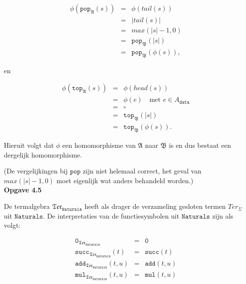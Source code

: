 \documentclass[a4paper,11pt]{article}
\begin{document}
\begin{eqnarray*}
\phi(\texttt{pop}_{\mathfrak{A}}(s)) & = & \phi(tail(s)) \\
                                     & = & |tail(s)| \\
                                     & = & max(|s| - 1, 0) \\
                                     & = & \texttt{pop}_{\mathfrak{B}}(|s|) \\
                                     & = & \texttt{pop}_{\mathfrak{B}}(\phi(s)),
\end{eqnarray*}

en

\begin{eqnarray*}
\phi(\texttt{top}_{\mathfrak{A}}(s)) & = & \phi(head(s)) \\
                                     & = & \phi(e) \quad \text{met $e \in A_{\texttt{data}}$} \\
                                     & = & \square \\
                                     & = & \texttt{top}_{\mathfrak{B}}(|s|) \\
                                     & = & \texttt{top}_{\mathfrak{B}}(\phi(s)).
\end{eqnarray*}

Hieruit volgt dat $\phi$ een homomorphisme van $\mathfrak{A}$ naar
$\mathfrak{B}$ is en dus bestaat een dergelijk homomorphisme.

(De vergelijkingen bij $\texttt{pop}$ zijn niet helemaal correct, het geval
van $max(|s|-1, 0)$ moet eigenlijk wat anders behandeld worden.)\\[2em]


{\bf Opgave 4.5} %

De termalgebra $\mathfrak{Ter}_{\texttt{Naturals}}$ heeft als drager de
verzameling gesloten termen $Ter_{\Sigma}$ uit $\texttt{Naturals}$. De
interpretaties van de functiesymbolen uit $\texttt{Naturals}$ zijn als volgt:

\begin{eqnarray*}
  \texttt{0}_{\mathfrak{Ter}_{\texttt{Naturals}}}        & = & \texttt{0} \\
  \texttt{succ}_{\mathfrak{Ter}_{\texttt{Naturals}}}(t)  & = & \texttt{succ}(t) \\
  \texttt{add}_{\mathfrak{Ter}_{\texttt{Naturals}}}(t,u) & = & \texttt{add}(t,u) \\
  \texttt{mul}_{\mathfrak{Ter}_{\texttt{Naturals}}}(t,u) & = & \texttt{mul}(t,u)
\end{eqnarray*}
\end{document}
